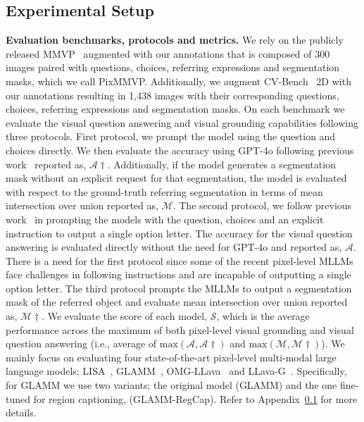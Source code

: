 \subsection{Experimental Setup}

\textbf{Evaluation benchmarks, protocols and metrics.}
We rely on the publicly released MMVP~\cite{tong2024eyes} augmented with our annotations that is composed of 300 images paired with questions, choices, referring expressions and segmentation masks, which we call PixMMVP. Additionally, we augment CV-Bench~\cite{tong2024cambrian} 2D with our annotations resulting in 1,438 images with their corresponding questions, choices, referring expressions and segmentation masks. On each benchmark we evaluate the visual question answering and visual grounding capabilities following three protocols. First protocol, we prompt the model using the question and choices directly. We then evaluate the accuracy using GPT-4o following previous work~\cite{tong2024eyes} reported as, $\mathcal{A}\dagger$. Additionally, if the model generates a segmentation mask without an explicit request for that segmentation, the model is evaluated with respect to the ground-truth referring segmentation in terms of mean intersection over union reported as, $\mathcal{M}$. The second protocol, we follow previous work~\cite{tong2024cambrian} in prompting the models with the question, choices and an explicit instruction to output a single option letter. The accuracy for the visual question answering is evaluated directly without the need for GPT-4o and reported as, $\mathcal{A}$. There is a need for the first protocol since some of the recent pixel-level MLLMs face challenges in following instructions and are incapable of outputting a single option letter. The third protocol prompts the MLLMs to output a segmentation mask of the referred object and evaluate mean intersection over union reported as, $\mathcal{M}\dagger$. We evaluate the score of each model, $\mathcal{S}$, which is the average performance across the maximum of both pixel-level visual grounding and visual question answering (i.e., average of $\text{max}(\mathcal{A}, \mathcal{A}\dagger)$ and $\text{max}(\mathcal{M}, \mathcal{M}\dagger)$). We mainly focus on evaluating four state-of-the-art pixel-level multi-modal large language models; LISA~\cite{lai2024lisa}, GLAMM~\cite{rasheed2024glamm}, OMG-LLava~\cite{zhang2024omg} and LLava-G~\cite{zhang2025llava}. Specifically, for GLAMM we use two variants; the original model (GLAMM) and the one fine-tuned for region captioning, (GLAMM-RegCap). Refer to Appendix~\ref{} for more details.%

